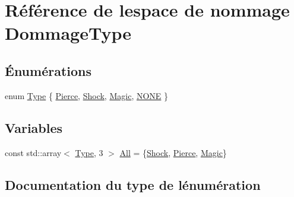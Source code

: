 \hypertarget{namespaceDommageType}{}\section{Référence de l\textquotesingle{}espace de nommage Dommage\+Type}
\label{namespaceDommageType}
\subsection*{Énumérations}
\begin{DoxyCompactItemize}
\item 
enum \hyperlink{namespaceDommageType_a6e5dff665b7631fe6ec9065dddbebcfd}{Type} \{ \hyperlink{namespaceDommageType_a6e5dff665b7631fe6ec9065dddbebcfdabca33f1e8d86b9faddd26010eb172ec0}{Pierce}, 
\hyperlink{namespaceDommageType_a6e5dff665b7631fe6ec9065dddbebcfdad7195516d2e659e73c0f22e64249517b}{Shock}, 
\hyperlink{namespaceDommageType_a6e5dff665b7631fe6ec9065dddbebcfdab12cf1b0c6c2cd00d9466c6cab208137}{Magic}, 
\hyperlink{namespaceDommageType_a6e5dff665b7631fe6ec9065dddbebcfda11352066c669cc04a816c1fbc404eb5f}{N\+O\+NE}
 \}
\end{DoxyCompactItemize}
\subsection*{Variables}
\begin{DoxyCompactItemize}
\item 
const std\+::array$<$ \hyperlink{namespaceDommageType_a6e5dff665b7631fe6ec9065dddbebcfd}{Type}, 3 $>$ \hyperlink{namespaceDommageType_a95378d0bf91b2850a1a5c112c35bb75c}{All} = \{\hyperlink{namespaceDommageType_a6e5dff665b7631fe6ec9065dddbebcfdad7195516d2e659e73c0f22e64249517b}{Shock}, \hyperlink{namespaceDommageType_a6e5dff665b7631fe6ec9065dddbebcfdabca33f1e8d86b9faddd26010eb172ec0}{Pierce}, \hyperlink{namespaceDommageType_a6e5dff665b7631fe6ec9065dddbebcfdab12cf1b0c6c2cd00d9466c6cab208137}{Magic}\}
\end{DoxyCompactItemize}


\subsection{Documentation du type de l\textquotesingle{}énumération}
\mbox{\label{namespaceDommageType_a6e5dff665b7631fe6ec9065dddbebcfd}} 
